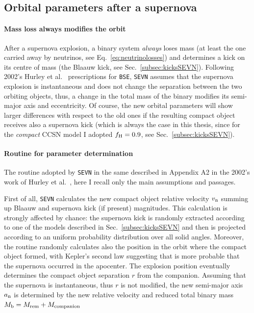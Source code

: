 \documentclass[a4paper,titlepage]{book}     	%
\begin{document}
\subsection{Orbital parameters after a supernova}\label{subsec:SEVNpostsupernovaorbit}
\paragraph{Mass loss always modifies the orbit} After a supernova explosion, a binary system \emph{always} loses mass (at least the one carried away by neutrinos, see Eq.\ \ref{eq:neutrinolosses}) and determines a kick on its centre of mass (the Blaauw kick, see Sec.\ \ref{subsec:kicksSEVN}). Following 2002's Hurley et al.\ \cite{Hurley2002} prescriptions for \texttt{BSE}, \texttt{SEVN} assumes that the supernova explosion is instantaneous and does not change the separation between the two orbiting objects, thus, a change in the total mass of the binary modifies its semi-major axis and eccentricity. Of course, the new orbital parameters will show larger differences with respect to the old ones if the resulting compact object receives also a supernova kick (which is always the case in this thesis, since for the \emph{compact} CCSN model I adopted $f_{\rm H}=0.9$, see Sec.\ \ref{subsec:kicksSEVN}).

\paragraph{Routine for parameter determination} The routine adopted by \texttt{SEVN} in the same described in Appendix A2 in the 2002's work of Hurley et al.\ \cite{Hurley2002}, here I recall only the main assumptions and passages. 

First of all, \texttt{SEVN} calculates the new compact object relative velocity $v_{\rm n}$ summing up Blaauw and supernova kick (if present) magnitudes. This calculation is strongly affected by chance: the supernova kick is randomly extracted according to one of the models described in Sec.\ \ref{subsec:kicksSEVN} and then is projected according to an uniform probability distribution over all solid angles. Moreover, the routine randomly calculates also the position in the orbit where the compact object formed, with Kepler's second law suggesting that is more probable that the supernova occurred in the apocenter. The explosion position eventually determines the compact object separation $r$ from the companion. Assuming that the supernova is instantaneous, thus $r$ is not modified, the new semi-major axis $a_{\rm n}$ is determined by the new relative velocity and reduced total binary mass $M_{\rm b} = M_{\rm rem} + M_{\rm companion}$
\end{document}
